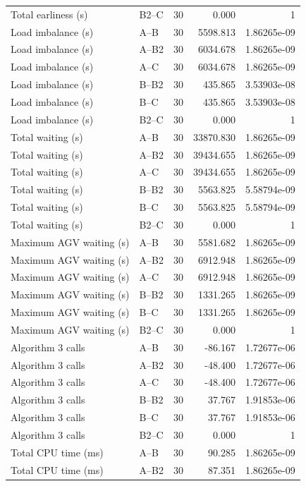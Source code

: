 \begin{table}[t]
\begin{tabular}{llrrr}
Total earliness (s) & B2--C & 30 & 0.000 & 1 \\
Load imbalance (s) & A--B & 30 & 5598.813 & 1.86265e-09 \\
Load imbalance (s) & A--B2 & 30 & 6034.678 & 1.86265e-09 \\
Load imbalance (s) & A--C & 30 & 6034.678 & 1.86265e-09 \\
Load imbalance (s) & B--B2 & 30 & 435.865 & 3.53903e-08 \\
Load imbalance (s) & B--C & 30 & 435.865 & 3.53903e-08 \\
Load imbalance (s) & B2--C & 30 & 0.000 & 1 \\
Total waiting (s) & A--B & 30 & 33870.830 & 1.86265e-09 \\
Total waiting (s) & A--B2 & 30 & 39434.655 & 1.86265e-09 \\
Total waiting (s) & A--C & 30 & 39434.655 & 1.86265e-09 \\
Total waiting (s) & B--B2 & 30 & 5563.825 & 5.58794e-09 \\
Total waiting (s) & B--C & 30 & 5563.825 & 5.58794e-09 \\
Total waiting (s) & B2--C & 30 & 0.000 & 1 \\
Maximum AGV waiting (s) & A--B & 30 & 5581.682 & 1.86265e-09 \\
Maximum AGV waiting (s) & A--B2 & 30 & 6912.948 & 1.86265e-09 \\
Maximum AGV waiting (s) & A--C & 30 & 6912.948 & 1.86265e-09 \\
Maximum AGV waiting (s) & B--B2 & 30 & 1331.265 & 1.86265e-09 \\
Maximum AGV waiting (s) & B--C & 30 & 1331.265 & 1.86265e-09 \\
Maximum AGV waiting (s) & B2--C & 30 & 0.000 & 1 \\
Algorithm 3 calls & A--B & 30 & -86.167 & 1.72677e-06 \\
Algorithm 3 calls & A--B2 & 30 & -48.400 & 1.72677e-06 \\
Algorithm 3 calls & A--C & 30 & -48.400 & 1.72677e-06 \\
Algorithm 3 calls & B--B2 & 30 & 37.767 & 1.91853e-06 \\
Algorithm 3 calls & B--C & 30 & 37.767 & 1.91853e-06 \\
Algorithm 3 calls & B2--C & 30 & 0.000 & 1 \\
Total CPU time (ms) & A--B & 30 & 90.285 & 1.86265e-09 \\
Total CPU time (ms) & A--B2 & 30 & 87.351 & 1.86265e-09 \\

\end{tabular}
\end{table}
